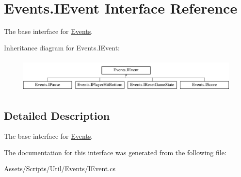 \hypertarget{interface_events_1_1_i_event}{}\section{Events.\+I\+Event Interface Reference}
\label{interface_events_1_1_i_event}


The base interface for \hyperlink{namespace_events}{Events}.  


Inheritance diagram for Events.\+I\+Event\+:\begin{figure}[H]
\begin{center}
\leavevmode
\includegraphics[height=1.794872cm]{interface_events_1_1_i_event}
\end{center}
\end{figure}


\subsection{Detailed Description}
The base interface for \hyperlink{namespace_events}{Events}. 



The documentation for this interface was generated from the following file\+:\begin{DoxyCompactItemize}
\item 
Assets/\+Scripts/\+Util/\+Events/I\+Event.\+cs\end{DoxyCompactItemize}

